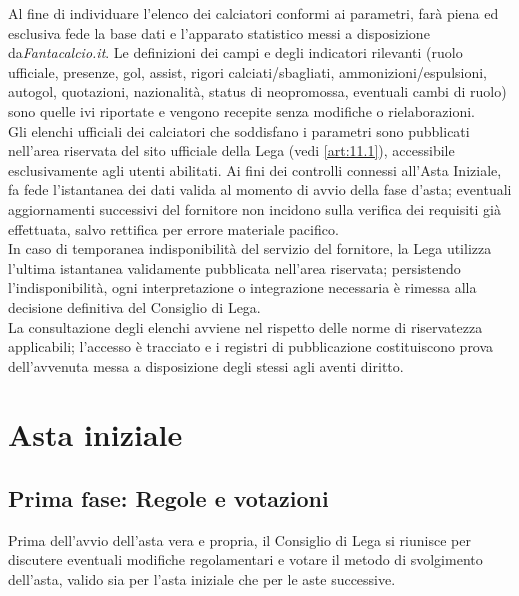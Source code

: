 Al fine di individuare l’elenco dei calciatori conformi ai parametri, farà piena ed esclusiva fede la base dati e l’apparato statistico messi a disposizione da\emph{Fantacalcio.it}. Le definizioni dei campi e degli indicatori rilevanti (ruolo ufficiale, presenze, gol, assist, rigori calciati/sbagliati, ammonizioni/espulsioni, autogol, quotazioni, nazionalità, status di neopromossa, eventuali cambi di ruolo) sono quelle ivi riportate e vengono recepite senza modifiche o rielaborazioni. \\

Gli elenchi ufficiali dei calciatori che soddisfano i parametri sono pubblicati nell’area riservata del sito ufficiale della Lega (vedi \ref{art:11.1}), accessibile esclusivamente agli utenti abilitati. Ai fini dei controlli connessi all’Asta Iniziale, fa fede l’istantanea dei dati valida al momento di avvio della fase d’asta; eventuali aggiornamenti successivi del fornitore non incidono sulla verifica dei requisiti già effettuata, salvo rettifica per errore materiale pacifico. \\

In caso di temporanea indisponibilità del servizio del fornitore, la Lega utilizza l’ultima istantanea validamente pubblicata nell’area riservata; persistendo l’indisponibilità, ogni interpretazione o integrazione necessaria è rimessa alla decisione definitiva del Consiglio di Lega. \\

La consultazione degli elenchi avviene nel rispetto delle norme di riservatezza applicabili; l’accesso è tracciato e i registri di pubblicazione costituiscono prova dell’avvenuta messa a disposizione degli stessi agli aventi diritto. \\

\section{Asta iniziale}
\label{art:4.4}

\subsection{Prima fase: Regole e votazioni}
\label{art:4.4.1}

Prima dell'avvio dell'asta vera e propria, il Consiglio di Lega si riunisce per discutere eventuali modifiche regolamentari e votare il metodo di svolgimento dell'asta, valido sia per l'asta iniziale che per le aste successive.

